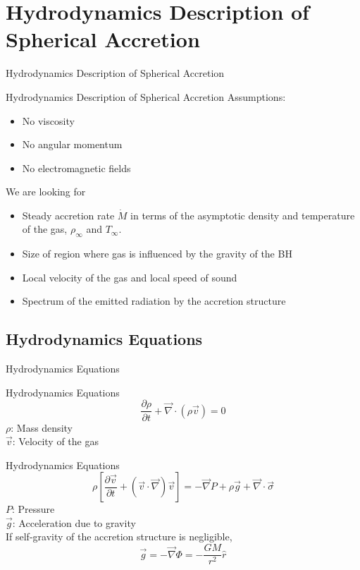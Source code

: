 \documentclass{beamer}
\begin{document}
\section{Hydrodynamics Description of Spherical Accretion}    
\begin{darkframes}

\begin{frame}
\Huge
Hydrodynamics Description of Spherical Accretion
\end{frame}

\begin{frame}{Hydrodynamics Description of Spherical Accretion}
	Assumptions:
	\pause
	\begin{itemize}
	\item No viscosity
	\pause
	\item No angular momentum
	\pause
	\item No electromagnetic fields
	\end{itemize}	
	We are looking for
	\pause
	\begin{itemize}
	\item Steady accretion rate $\dot{M}$ in terms of the asymptotic density and temperature of the gas, $\rho_\infty$ and $T_\infty$.
	\pause
	\item Size of region where gas is influenced by the gravity of the BH
	\pause 
	\item Local velocity of the gas and local speed of sound
	\pause
	\item Spectrum of the emitted radiation by the accretion structure
	\end{itemize}
\end{frame}

\subsection{Hydrodynamics Equations}
\begin{frame}
\Huge
Hydrodynamics Equations
\end{frame}

\begin{frame}{Hydrodynamics Equations}
    \[ \frac{\partial \rho}{\partial t} + \vec{\nabla} \cdot \left( \rho \vec{v}\right) = 0 \]
    \pause
    \bigskip
    \justify
	$\rho$: Mass density\\
	$\vec{v}$: Velocity of the gas
\end{frame}

\begin{frame}{Hydrodynamics Equations}
	\[ \rho \left[\frac{\partial \vec{v}}{\partial t} + \left( \vec{v} \cdot \vec{\nabla} \right) \vec{v} \right]
	= -\vec{\nabla} P + \rho \vec{g} + \vec{\nabla} \cdot \vec{\sigma}\]
	\pause
	\bigskip
	\justify
	$P$: Pressure\\
	$\vec{g}$: Acceleration due to gravity\\
	\pause  
	If self-gravity of the accretion structure is negligible,
	\[ \vec{g} = -\vec{\nabla} \Phi = -\frac{GM}{r^2} \hat{r}\]
\end{frame}


\end{darkframes}
\end{document}
